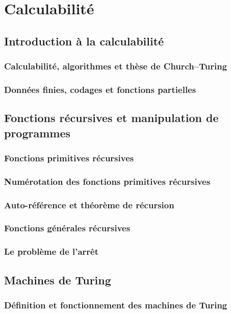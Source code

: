 \chapter{Calculabilité}\label{chapter-computability}

\section{Introduction à la calculabilité}
\subsection{Calculabilité, algorithmes et thèse de Church--Turing}
\subsection{Données finies, codages et fonctions partielles}

\section{Fonctions récursives et manipulation de programmes}
\subsection{Fonctions primitives récursives}
\subsection{Numérotation des fonctions primitives récursives}
\subsection{Auto-référence et théorème de récursion}
\subsection{Fonctions générales récursives}
\subsection{Le problème de l'arrêt}

\section{Machines de Turing}
\subsection{Définition et fonctionnement des machines de Turing}
